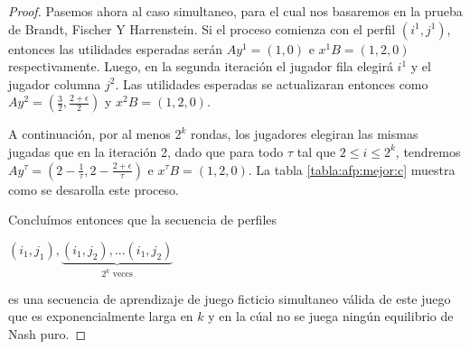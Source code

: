 \begin{proof}
    Pasemos ahora al caso simultaneo, para el cual nos basaremos en la prueba de Brandt, Fischer Y Harrenstein. Si el proceso comienza con el perfil $(i^1, j^1)$, entonces las utilidades esperadas serán $Ay^1 = (1, 0)$ e $x^1 B = (1, 2, 0)$ respectivamente. Luego, en la segunda iteración el jugador fila elegirá $i^1$ y el jugador columna $j^2$. Las utilidades esperadas se actualizaran entonces como $Ay^2 = (\frac{3}{2}, \frac{2 + \epsilon}{2})$ y $x^2 B = (1, 2, 0)$.

    A continuación, por al menos $2^k$ rondas, los jugadores elegiran las mismas jugadas que en la iteración 2, dado que para todo $\tau$ tal que $2 \le i \le 2^k$, tendremos $Ay^\tau = (2 - \frac{1}{\tau}, 2 - \frac{2 + \epsilon}{\tau})$ e $x^\tau B = (1, 2, 0)$. La tabla \ref{tabla:afp:mejor:c} muestra como se desarolla este proceso.

    Concluímos entonces que la secuencia de perfiles

    \begin{center}
    \begin{math}
        (i_1, j_1), \underbrace{(i_1, j_2), ... (i_1, j_2)}_{\text{$2^k$ veces}}
    \end{math}
    \end{center}


    es una secuencia de aprendizaje de juego ficticio simultaneo válida de este juego que es exponencialmente larga en $k$ y en la cúal no se juega ningún equilibrio de Nash puro.

\end{proof}